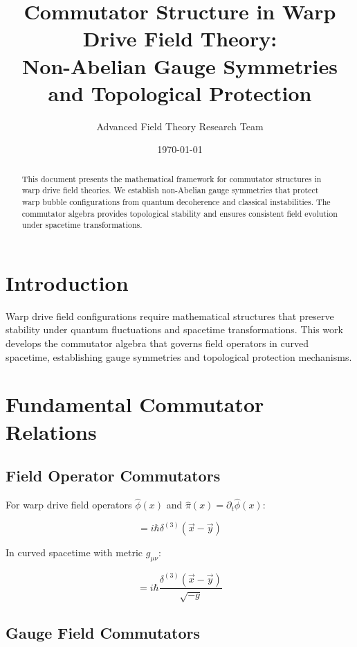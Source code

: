 \documentclass[12pt,a4paper]{article}
\title{Commutator Structure in Warp Drive Field Theory:\\Non-Abelian Gauge Symmetries and Topological Protection}
\author{Advanced Field Theory Research Team}
\date{\today}
\begin{document}
\maketitle

\begin{abstract}
This document presents the mathematical framework for commutator structures in warp drive field theories. We establish non-Abelian gauge symmetries that protect warp bubble configurations from quantum decoherence and classical instabilities. The commutator algebra provides topological stability and ensures consistent field evolution under spacetime transformations.
\end{abstract}

\section{Introduction}

Warp drive field configurations require mathematical structures that preserve stability under quantum fluctuations and spacetime transformations. This work develops the commutator algebra that governs field operators in curved spacetime, establishing gauge symmetries and topological protection mechanisms.

\section{Fundamental Commutator Relations}

\subsection{Field Operator Commutators}

For warp drive field operators $\hat{\phi}(x)$ and $\hat{\pi}(x) = \partial_t \hat{\phi}(x)$:

\begin{equation}
[\hat{\phi}(x), \hat{\pi}(y)] = i\hbar \delta^{(3)}(\vec{x} - \vec{y})
\end{equation}

In curved spacetime with metric $g_{\mu\nu}$:

\begin{equation}
[\hat{\phi}(x), \hat{\pi}(y)] = i\hbar \frac{\delta^{(3)}(\vec{x} - \vec{y})}{\sqrt{-g}}
\end{equation}

\subsection{Gauge Field Commutators}
\end{document}
